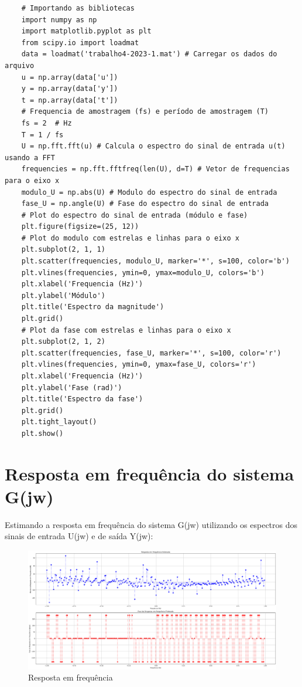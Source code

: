 \documentclass[10pt]{article}
\begin{document}
\small
\begin{verbatim}
    # Importando as bibliotecas
    import numpy as np
    import matplotlib.pyplot as plt
    from scipy.io import loadmat
    data = loadmat('trabalho4-2023-1.mat') # Carregar os dados do arquivo
    u = np.array(data['u'])
    y = np.array(data['y'])
    t = np.array(data['t'])
    # Frequencia de amostragem (fs) e período de amostragem (T)
    fs = 2  # Hz
    T = 1 / fs
    U = np.fft.fft(u) # Calcula o espectro do sinal de entrada u(t) usando a FFT
    frequencies = np.fft.fftfreq(len(U), d=T) # Vetor de frequencias para o eixo x
    modulo_U = np.abs(U) # Modulo do espectro do sinal de entrada
    fase_U = np.angle(U) # Fase do espectro do sinal de entrada
    # Plot do espectro do sinal de entrada (módulo e fase)
    plt.figure(figsize=(25, 12))
    # Plot do modulo com estrelas e linhas para o eixo x
    plt.subplot(2, 1, 1)
    plt.scatter(frequencies, modulo_U, marker='*', s=100, color='b')
    plt.vlines(frequencies, ymin=0, ymax=modulo_U, colors='b')
    plt.xlabel('Frequencia (Hz)')
    plt.ylabel('Módulo')
    plt.title('Espectro da magnitude')
    plt.grid()
    # Plot da fase com estrelas e linhas para o eixo x
    plt.subplot(2, 1, 2)
    plt.scatter(frequencies, fase_U, marker='*', s=100, color='r')
    plt.vlines(frequencies, ymin=0, ymax=fase_U, colors='r')
    plt.xlabel('Frequencia (Hz)')
    plt.ylabel('Fase (rad)')
    plt.title('Espectro da fase')
    plt.grid()
    plt.tight_layout()
    plt.show()
\end{verbatim}

\section{Resposta em frequência do sistema G(jw)}

\quad Estimando a resposta em frequência do sistema G(jw) utilizando os espectros dos sinais
de entrada U(jw) e de saída Y(jw):

\begin{figure}[h]
    \centering
    \includegraphics[scale=0.26]{g.png}
    \caption{Resposta em frequência}
\end{figure}
\end{document}
